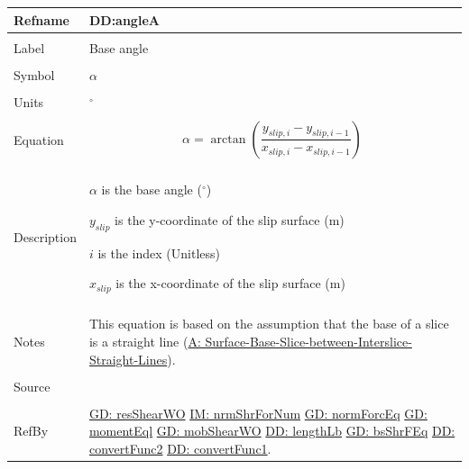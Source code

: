 \documentclass[12pt]{article}
\begin{document}
\noindent \begin{minipage}{\textwidth}
\begin{tabular}{p{} p{}}
\toprule \textbf{Refname} & \textbf{DD:angleA}
\label{DD:angleA}
\\ \midrule \\
Label & Base angle
        \\ \midrule \\
        Symbol & $α$
                 \\ \midrule \\
                 Units & ${}^{\circ}$
                         \\ \midrule \\
                         Equation & \begin{displaymath}
                                    α=\arctan\left(\frac{{y_{slip,i}}-{y_{slip,i-1}}}{{x_{slip,i}}-{x_{slip,i-1}}}\right)
                                    \end{displaymath}
                                    \\ \midrule \\
                                    Description & \begin{symbDescription}
                                                  \item{$α$ is the base angle (${}^{\circ}$)}
                                                  \item{${y_{slip}}$ is the y-coordinate of the slip surface (m)}
                                                  \item{$i$ is the index (Unitless)}
                                                  \item{${x_{slip}}$ is the x-coordinate of the slip surface (m)}
                                                  \end{symbDescription}
                                                  \\ \midrule \\
                                                  Notes & This equation is based on the assumption that the base of a slice is a straight line (\hyperref[assumpSBSBISL]{A: Surface-Base-Slice-between-Interslice-Straight-Lines}).
                                                          \\ \midrule \\
                                                          Source & \cite{fredlund1977}
                                                                   \\ \midrule \\
                                                                   RefBy & \hyperref[GD:resShearWO]{GD: resShearWO} \hyperref[IM:nrmShrForNum]{IM: nrmShrForNum} \hyperref[GD:normForcEq]{GD: normForcEq} \hyperref[GD:momentEql]{GD: momentEql} \hyperref[GD:mobShearWO]{GD: mobShearWO} \hyperref[DD:lengthLb]{DD: lengthLb} \hyperref[GD:bsShrFEq]{GD: bsShrFEq} \hyperref[DD:convertFunc2]{DD: convertFunc2} \hyperref[DD:convertFunc1]{DD: convertFunc1}.
\\ \bottomrule \end{tabular}
\end{minipage}
\end{document}
